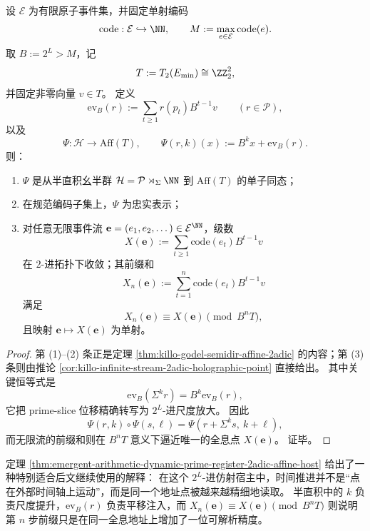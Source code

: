 \begin{theorem}\label{thm:emergent-arithmetic-dynamic-prime-register-2adic-affine-host}
设 \(\mathcal E\) 为有限原子事件集，并固定单射编码
\[
\mathrm{code}:\mathcal E\hookrightarrow \NN,
\qquad
M:=\max_{e\in\mathcal E}\mathrm{code}(e).
\]
取 \(B:=2^L>M\)，记
\[
T:=T_2(E_{\min})\cong \ZZ_2^2,
\]
并固定非零向量 \(v\in T\)。
定义
\[
\mathrm{ev}_B(r):=\sum_{t\ge 1}r(p_t)B^{t-1}v
\qquad (r\in\mathcal P),
\]
以及
\[
\Psi:\mathcal H\to \mathrm{Aff}(T),
\qquad
\Psi(r,k)(x):=B^k x+\mathrm{ev}_B(r).
\]
则：
\begin{enumerate}
  \item \(\Psi\) 是从半直积幺半群 \(\mathcal H=\mathcal P\rtimes_{\Sigma}\NN\) 到 \(\mathrm{Aff}(T)\) 的单子同态；
  \item 在规范编码子集上，\(\Psi\) 为忠实表示；
  \item 对任意无限事件流 \(\mathbf e=(e_1,e_2,\dots)\in\mathcal E^{\NN}\)，级数
  \[
  X(\mathbf e):=\sum_{t\ge 1}\mathrm{code}(e_t)B^{t-1}v
  \]
  在 \(2\)-进拓扑下收敛；其前缀和
  \[
  X_n(\mathbf e):=\sum_{t=1}^{n}\mathrm{code}(e_t)B^{t-1}v
  \]
  满足
  \[
  X_n(\mathbf e)\equiv X(\mathbf e)\pmod{B^nT},
  \]
  且映射 \(\mathbf e\mapsto X(\mathbf e)\) 为单射。
\end{enumerate}
\end{theorem}

\begin{proof}
第 (1)--(2) 条正是定理 \ref{thm:killo-godel-semidir-affine-2adic} 的内容；第 (3) 条则由推论 \ref{cor:killo-infinite-stream-2adic-holographic-point} 直接给出。
其中关键恒等式是
\[
\mathrm{ev}_B(\Sigma^k r)=B^k\mathrm{ev}_B(r),
\]
它把 prime-slice 位移精确转写为 \(2^L\)-进尺度放大。
因此
\[
\Psi(r,k)\circ \Psi(s,\ell)=\Psi(r+\Sigma^k s,\ k+\ell),
\]
而无限流的前缀和则在 \(B^nT\) 意义下逼近唯一的全息点 \(X(\mathbf e)\)。
证毕。
\end{proof}

\begin{remark}[时间推进可解释为地址精度提升]\label{rem:emergent-arithmetic-dynamic-prime-register-address-refinement}
定理 \ref{thm:emergent-arithmetic-dynamic-prime-register-2adic-affine-host} 给出了一种特别适合后文继续使用的解释：
在这个 \(2^L\)-进仿射宿主中，时间推进并不是“点在外部时间轴上运动”，而是同一个地址点被越来越精细地读取。
半直积中的 \(k\) 负责尺度提升，\(\mathrm{ev}_B(r)\) 负责平移注入，而 \(X_n(\mathbf e)\equiv X(\mathbf e)\pmod{B^nT}\) 则说明第 \(n\) 步前缀只是在同一全息地址上增加了一位可解析精度。
\end{remark}

